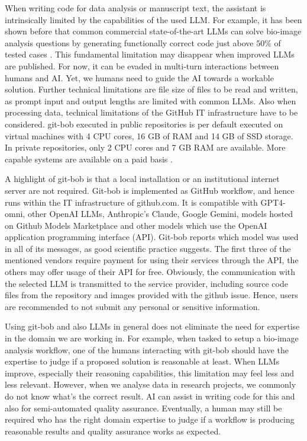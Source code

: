 \documentclass[times, twoside]{zHenriquesLab-StyleBioRxiv}
\begin{document}
When writing code for data analysis or manuscript text, the assistant is intrinsically limited by the capabilities of the used LLM. For example, it has been shown before that common commercial state-of-the-art LLMs can solve bio-image analysis questions by generating functionally correct code just above $50\%$ of tested cases \cite{benchmark_llm_bia}. This fundamental limitation may disappear when improved LLMs are published. For now, it can be evaded in multi-turn interactions between humans and AI. Yet, we humans need to guide the AI towards a workable solution. Further technical limitations are file size of files to be read and written, as prompt input and output lengths are limited with common LLMs. Also when processing data, technical limitations of the GitHub IT infrastructure have to be considered. git-bob executed in public repositories is per default executed on virtual machines with 4 CPU cores, 16  GB of RAM and 14 GB of SSD storage. In private repositories, only 2 CPU cores and 7 GB RAM are available. More capable systems are available on a paid basis \cite{github_actions_runners_2024}. 

A highlight of git-bob is that a local installation or an institutional internet server are not required. Git-bob is implemented as GitHub workflow, and hence runs within the IT infrastructure of github.com. It is compatible with GPT4-omni, other OpenAI LLMs, Anthropic's Claude, Google Gemini, models hosted on Github Models Marketplace and other models which use the OpenAI application programming interface (API). Git-bob reports which model was used in all of its messages, as good scientific practice suggests. The first three of the mentioned vendors require payment for using their services through the API, the others may offer usage of their API for free. Obviously, the communication with the selected LLM is transmitted to the service provider, including source code files from the repository and images provided with the github issue. Hence, users are recommended to not submit any personal or sensitive information. 

Using git-bob and also LLMs in general does not eliminate the need for expertise in the domain we are working in. For example, when tasked to setup a bio-image analysis workflow, one of the humans interacting with git-bob should have the expertise to judge if a proposed solution is reasonable at least. When LLMs improve, especially their reasoning capabilities, this limitation may feel less and less relevant. However, when we analyse data in research projects, we commonly do not know what's the correct result. AI can assist in writing code for this and also for semi-automated quality assurance. Eventually, a human may still be required who has the right domain expertise to judge if a workflow is producing reasonable results and quality assurance works as expected.
\end{document}
